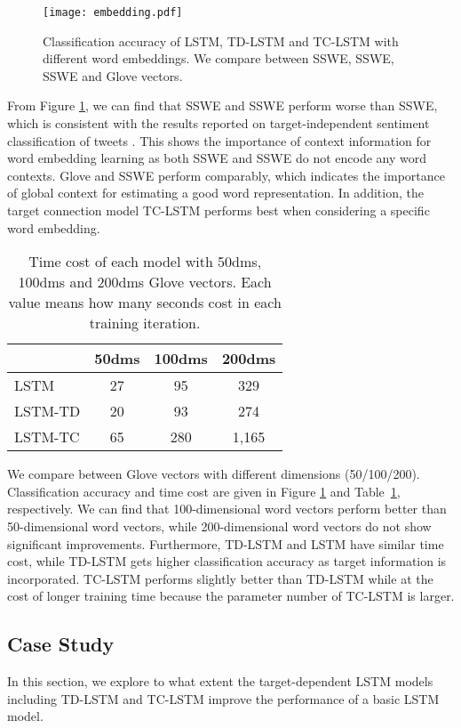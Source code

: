 \documentclass[11pt]{article}
\begin{document}
\begin{figure}[h]
	\centering
	\texttt{[image: embedding.pdf]}
	\caption{Classification accuracy of LSTM, TD-LSTM and TC-LSTM with different word embeddings. We compare between SSWE, SSWE, SSWE and Glove vectors.}
	\label{fig:result-embedding}
\end{figure}
From Figure \ref{fig:result-embedding}, we can find that SSWE and SSWE perform worse than SSWE, which is consistent with the results reported on target-independent sentiment classification of tweets \cite{Tang2014}. This shows the importance of context information for word embedding learning as both  SSWE and SSWE do not encode any word contexts. 
Glove and SSWE perform comparably, which indicates the importance of global context for estimating a good word representation. 
In addition, the target connection model TC-LSTM performs best when considering a specific word embedding.




\begin{table}[h]
	\centering
	\begin{tabular}{l|c|c|c}
		\hline
		& 50dms & 100dms & 200dms\\
		\hline
		LSTM	& 	27	&	95		&  329\\
		LSTM-TD	&	20	&	93		&  274\\
		LSTM-TC	&	65	&	280		&  1,165\\
		\hline		
	\end{tabular}
	\caption{Time cost of each model with 50dms, 100dms and 200dms Glove vectors. Each value means how many seconds cost in each training iteration.}
	\label{table:embedding-dms}
\end{table}
We  compare between Glove vectors with different dimensions (50/100/200). Classification accuracy and time cost are given in Figure \ref{fig:result-embedding} and Table~\ref{table:embedding-dms}, respectively.
We can find that 100-dimensional word vectors perform better than 50-dimensional word vectors, while 200-dimensional word vectors do not show significant improvements. 
Furthermore, TD-LSTM and LSTM have similar time cost, while TD-LSTM gets higher classification accuracy as target information is incorporated. 
TC-LSTM performs slightly better than TD-LSTM while at the cost of longer training time because the parameter number of TC-LSTM is larger. 


\subsection{Case Study}
In this section, we explore to what extent the target-dependent LSTM models including TD-LSTM and TC-LSTM improve the performance of a basic LSTM model.
\end{document}
